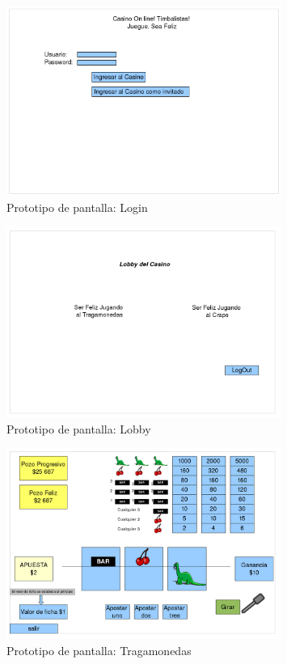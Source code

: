 


	\begin{figure}[p!hbt]
		\centering
		\includegraphics[width=0.8\textwidth]{../img/PPLogin.png}
		\caption{Prototipo de pantalla: Login }
		\label{fig:login}
	\end{figure}


        \begin{figure}[p!hbt]

		\centering
		\includegraphics[width=0.8\textwidth]{../img/PPLobby.png}
		\caption{Prototipo de pantalla: Lobby }
		\label{fig:lobby}
	\end{figure}

	\begin{figure}[p!hbt]
		\centering
		\includegraphics[width=0.8\textwidth]{../img/PPTraga.png}
		\caption{Prototipo de pantalla: Tragamonedas }
		\label{fig:traga}
	\end{figure}

